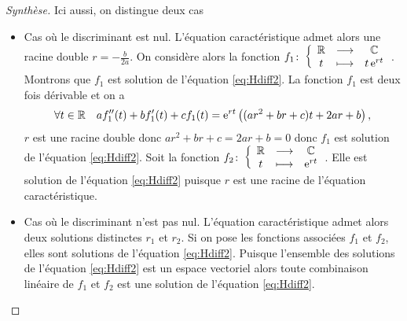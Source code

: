 \begin{proof}[Synthèse]
  Ici aussi, on distingue deux cas
\begin{itemize}
\item Cas où le discriminant est nul. L'équation caractéristique admet alors une racine double \(r=-\frac{b}{2a}\). On considère alors la fonction \(f_1\colon \left\{\begin{array}{ccc} \mathbb{R} & \longrightarrow &\mathbb{C}\\ t & \longmapsto & t\operatorname{e}^{rt} \end{array} \right.\). Montrons que \(f_1\) est solution de l'équation \eqref{eq:Hdiff2}. La fonction \(f_1\) est deux fois dérivable et on a 
  \begin{equation}
    \forall t \in \mathbb{R}  \quad af_1''(t)+bf_1'(t)+cf_1(t)=\operatorname{e}^{rt} \left( (ar^2+br+c)t + 2ar+b \right),
  \end{equation}
\(r\) est une racine double donc \(ar^2+br+c=2ar+b=0\) donc \(f_1\) est solution de l'équation \eqref{eq:Hdiff2}. Soit la fonction \(f_2\colon \left\{\begin{array}{ccc} \mathbb{R} & \longrightarrow &\mathbb{C}\\ t & \longmapsto & \operatorname{e}^{rt} \end{array} \right.\). Elle est solution de l'équation \eqref{eq:Hdiff2} puisque \(r\) est une racine de l'équation caractéristique.
\item Cas où le discriminant n'est pas nul. L'équation caractéristique admet alors deux solutions distinctes \(r_1\) et \(r_2\). Si on pose les fonctions associées \(f_1\) et \(f_2\), elles sont solutions de l'équation \eqref{eq:Hdiff2}. Puisque l'ensemble des solutions de l'équation \eqref{eq:Hdiff2} est un espace vectoriel alors toute combinaison linéaire de \(f_1\) et \(f_2\) est une solution de l'équation \eqref{eq:Hdiff2}.
\end{itemize}
\end{proof}
%
